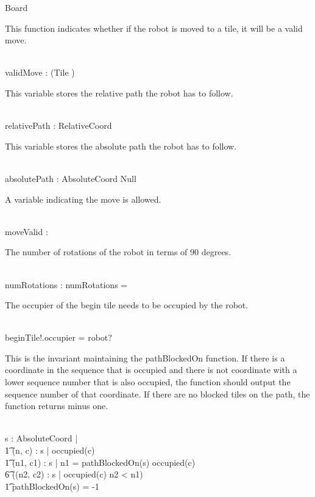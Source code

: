 \begin{class}{Board}
\begin{nobothschema}
\begin{zpar}
This function indicates whether if the robot is moved to a tile, it will be a valid move.
\end{zpar} \\
validMove : \power (Tile \fun \bool) \\
\begin{zpar}
This variable stores the relative path the robot has to follow.
\end{zpar} \\
relativePath : \power \seq RelativeCoord\\
\begin{zpar}
This variable stores the absolute path the robot has to follow.
\end{zpar} \\
absolutePath : \power \seq AbsoluteCoord \cup Null\\
\begin{zpar}
A variable indicating the move is allowed.
\end{zpar} \\
moveValid : \bool \\
\begin{zpar}
The number of rotations of the robot in terms of 90 degrees.
\end{zpar} \\
numRotations : \nat
\where
numRotations = 
\also \also \also
\begin{zpar}
The occupier of the begin tile needs to be occupied by the robot.
\end{zpar} \\
beginTile!.occupier = robot?
\also \also \also
\begin{zpar}
This is the invariant maintaining the pathBlockedOn function. If there is a coordinate in the sequence that is occupied and there is not coordinate with a lower sequence number that is also occupied, the function should output the sequence number of that coordinate. If there are no blocked tiles on the path, the function returns minus one.
\end{zpar} \\
\forall s : \power \seq AbsoluteCoord | \\ \t1
 \IF \exists (n, c) : s | occupied(c) \\ \t1
 \THEN \exists (n1, c1) : s | n1 = pathBlockedOn(s) \wedge occupied(c) \; \; \wedge \\ \t6
 (\neg \exists (n2, c2) : s | occupied(c) \wedge n2 < n1) \\ \t1
 \ELSE pathBlockedOn(s) = -1
\end{nobothschema}

\end{class}
